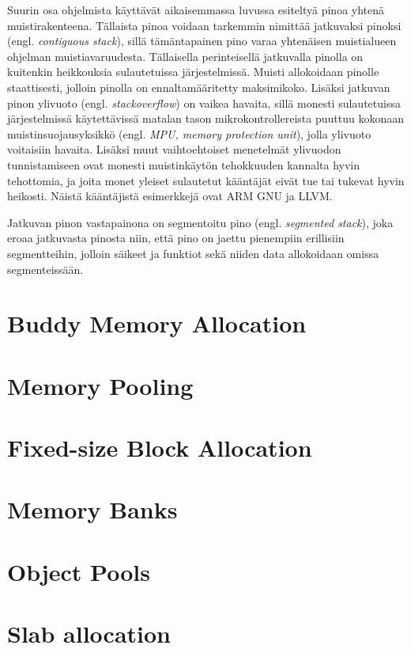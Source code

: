Suurin osa ohjelmista käyttävät aikaisemmassa luvussa esiteltyä pinoa yhtenä muistirakenteena. Tällaista pinoa voidaan tarkemmin nimittää jatkuvaksi pinoksi (engl. \textit{contiguous stack}), sillä tämäntapainen pino varaa yhtenäisen muistialueen ohjelman muistiavaruudesta. Tällaisella perinteisellä jatkuvalla pinolla on kuitenkin heikkouksia sulautetuissa järjestelmissä. Muisti allokoidaan pinolle staattisesti, jolloin pinolla on ennaltamääritetty maksimikoko. Lisäksi jatkuvan pinon ylivuoto (engl. \textit{stackoverflow}) on vaikea havaita, sillä monesti sulautetuissa järjestelmissä käytettävissä matalan tason mikrokontrollereista puuttuu kokonaan muistinsuojausyksikkö (engl. \textit{MPU, memory protection unit}), jolla ylivuoto voitaisiin havaita. Lisäksi muut vaihtoehtoiset menetelmät ylivuodon tunnistamiseen ovat monesti muistinkäytön tehokkuuden kannalta hyvin tehottomia, ja joita monet yleiset sulautetut kääntäjät eivät tue tai tukevat hyvin heikosti. Näistä kääntäjistä esimerkkejä ovat ARM GNU ja LLVM.\cite{bsstes@2023}

Jatkuvan pinon vastapainona on segmentoitu pino (engl. \textit{segmented stack}), joka eroaa jatkuvasta pinosta niin, että pino on jaettu pienempiin erillisiin segmentteihin, jolloin säikeet ja funktiot sekä niiden data allokoidaan omissa segmenteissään.\cite{bsstes@2023}


\section{Buddy Memory Allocation}
\section{Memory Pooling}
\section{Fixed-size Block Allocation}
\section{Memory Banks}
\section{Object Pools}
\section{Slab allocation}